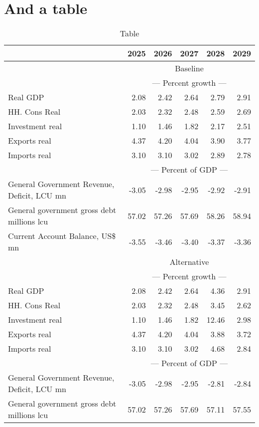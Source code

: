 \documentclass{article}
\begin{document}
\section{And a table}
\begin{table}[ht]
\caption{Table}
\begin{tabular}{lrrrrr}
\toprule
 & 2025 & 2026 & 2027 & 2028 & 2029 \\
\midrule
&\multicolumn{5}{c}{{Baseline}}                          \\
&\multicolumn{5}{c}{{--- Percent growth ---}}                          \\
Real GDP & 2.08 & 2.42 & 2.64 & 2.79 & 2.91 \\
HH. Cons Real & 2.03 & 2.32 & 2.48 & 2.59 & 2.69 \\
Investment real & 1.10 & 1.46 & 1.82 & 2.17 & 2.51 \\
Exports real & 4.37 & 4.20 & 4.04 & 3.90 & 3.77 \\
Imports real & 3.10 & 3.10 & 3.02 & 2.89 & 2.78 \\
&\multicolumn{5}{c}{{--- Percent of GDP ---}}                          \\
General Government Revenue, Deficit, LCU mn & -3.05 & -2.98 & -2.95 & -2.92 & -2.91 \\
General government gross debt millions lcu & 57.02 & 57.26 & 57.69 & 58.26 & 58.94 \\
Current Account Balance, US\$ mn & -3.55 & -3.46 & -3.40 & -3.37 & -3.36 \\
&\multicolumn{5}{c}{{Alternative}}                          \\
&\multicolumn{5}{c}{{--- Percent growth ---}}                          \\
Real GDP & 2.08 & 2.42 & 2.64 & 4.36 & 2.91 \\
HH. Cons Real & 2.03 & 2.32 & 2.48 & 3.45 & 2.62 \\
Investment real & 1.10 & 1.46 & 1.82 & 12.46 & 2.98 \\
Exports real & 4.37 & 4.20 & 4.04 & 3.88 & 3.72 \\
Imports real & 3.10 & 3.10 & 3.02 & 4.68 & 2.84 \\
&\multicolumn{5}{c}{{--- Percent of GDP ---}}                          \\
General Government Revenue, Deficit, LCU mn & -3.05 & -2.98 & -2.95 & -2.81 & -2.84 \\
General government gross debt millions lcu & 57.02 & 57.26 & 57.69 & 57.11 & 57.55 \\

\end{tabular}
\end{table}
\end{document}
